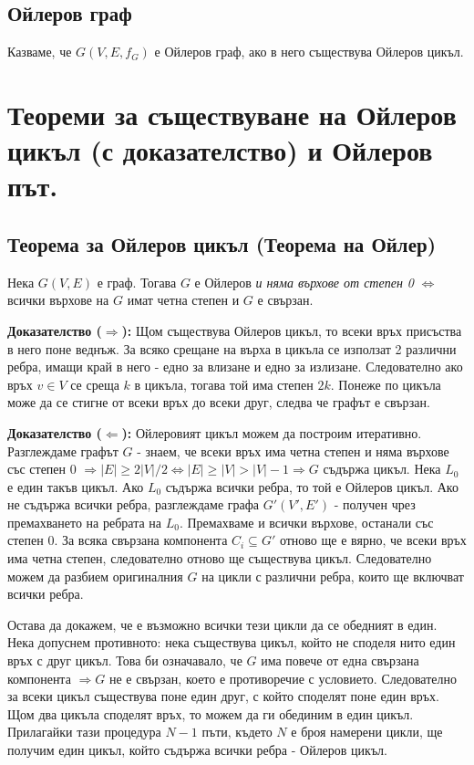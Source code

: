 \documentclass[fleqn,12pt]{article}
\begin{document}
\subsection{Ойлеров граф} 
Казваме, че $G(V,E,f_G)$ е Ойлеров граф, ако в него съществува Ойлеров цикъл.

\section{Теореми за съществуване на Ойлеров цикъл (с доказателство) и Ойлеров път.}

\subsection{Теорема за Ойлеров цикъл (Теорема на Ойлер)} 
Нека $G(V,E)$ е граф. Тогава $G$ е Ойлеров \textit{и няма върхове от степен 0} $\Leftrightarrow$
всички върхове на $G$ имат четна степен и $G$ е свързан.

\textbf{Доказателство ($\Rightarrow$): } Щом съществува Ойлеров цикъл, то всеки връх присъства в него поне веднъж.
За всяко срещане на върха в цикъла се използат 2 различни ребра, имащи край в него - едно за влизане и едно за излизане.
Следователно ако връх $v \in V$ се среща $k$ в цикъла, тогава той има степен $2k$. Понеже по цикъла може да се стигне от
всеки връх до всеки друг, следва че графът е свързан.

\textbf{Доказателство ($\Leftarrow$): } Ойлеровият цикъл можем да построим итеративно. Разглеждаме графът $G$ - знаем, че всеки връх има четна степен и
няма върхове със степен 0 $\Rightarrow |E| \geq 2 |V| / 2 \Leftrightarrow |E| \geq |V| > |V| - 1 \Rightarrow G$ съдържа цикъл.  
Нека $L_0$ е един такъв цикъл. Ако $L_0$ съдържа всички ребра, то той е Ойлеров цикъл. 
Ако не съдържа всички ребра, разглеждаме графа $G'(V', E')$ - получен чрез премахването на ребрата на $L_0$. 
Премахваме и всички върхове, останали със степен 0. За всяка свързана компонента $C_i \subseteq G'$ отново ще е вярно,
че всеки връх има четна степен, следователно отново ще съществува цикъл. Следователно можем да разбием оригиналния
$G$ на цикли с различни ребра, които ще включват всички ребра. 

Остава да докажем, че е възможно всички тези цикли да се обедният в един. Нека допуснем противното: нека съществува цикъл,
който не споделя нито един връх с друг цикъл. Това би означавало, че $G$ има повече от една свързана компонента 
$\Rightarrow G$ не е свързан, което е противоречие с условието. Следователно за всеки цикъл съществува поне един друг,
с който споделят поне един връх. Щом два цикъла споделят връх, то можем да ги обединим в един цикъл. Прилагайки тази процедура
$N - 1$ пъти, където $N$ е броя намерени цикли, ще получим един цикъл, който съдържа всички ребра - Ойлеров цикъл. 
\vspace{10mm}
\end{document}
